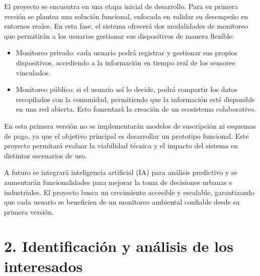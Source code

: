 \documentclass[
11pt, %
]{charter}
\begin{document}
El proyecto se encuentra en una etapa inicial de desarrollo. Para su primera versión se plantea una solución funcional, enfocada en validar su desempeño en entornos reales. En esta fase, el sistema ofrecerá dos modalidades de monitoreo que permitirán a los usuarios gestionar sus dispositivos de manera flexible:  

\begin{itemize}
    \item Monitoreo privado: cada usuario podrá registrar y gestionar sus propios dispositivos, accediendo a la información en tiempo real de los sensores vinculados.  
    \item Monitoreo público: si el usuario así lo decide, podrá compartir los datos recopilados con la comunidad, permitiendo que la información esté disponible en una red abierta. Esto fomentará la creación de un ecosistema colaborativo.  
\end{itemize}

En esta primera versión no se implementarán modelos de suscripción ni esquemas de pago, ya que el objetivo principal es desarrollar un prototipo funcional. Este proyecto permitará evaluar la viabilidad técnica y el impacto del sistema en distintos escenarios de uso.  

A futuro se integrará inteligencia artificial (IA) para análisis predictivo y se aumentarán funcionalidades para mejorar la toma de decisiones urbanas e industriales. El proyecto busca un crecimiento accesible y escalable, garantizando que cada usuario se beneficien de un monitoreo ambiental confiable desde su primera versión.



\vspace{25px}


\section{2. Identificación y análisis de los interesados}
\label{sec:interesados}
\end{document}
